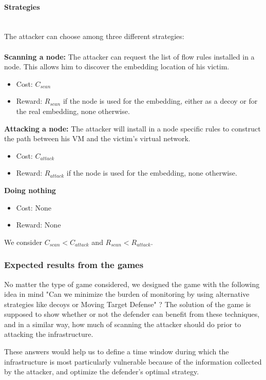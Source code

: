 \paragraph{Strategies}\textbf{\\}
The attacker can choose among three different strategies:\\ \\
\textbf{Scanning a node: } The attacker can request the list of  flow rules installed in a node. This allows him to discover the embedding location of his victim.
\begin{itemize}
    \item Cost: $C_{scan}$
    \item Reward: $R_{scan}$ if the node is used for the embedding, either as a decoy or for the real embedding, none otherwise.
\end{itemize}


\textbf{Attacking a node: } The attacker will install in a node specific rules to construct the path between his VM and the victim's virtual network.
\begin{itemize}
    \item Cost: $C_{attack}$
    \item Reward: $R_{attack}$ if the node is used for the embedding, none otherwise. 
\end{itemize}

\textbf{Doing nothing}
\begin{itemize}
    \item Cost: None
    \item Reward: None
\end{itemize}

We consider $C_{scan}< C_{attack}$ and $R_{scan}< R_{attack}$.

\subsubsection{Expected results from the games}
No matter the type of game considered, we designed the game with the following idea in mind "Can we minimize the burden of monitoring by using alternative strategies like decoys or Moving Target Defense" ?
The solution of the game is supposed to show whether or not the defender can benefit from these techniques, and in a similar way, how much of scanning the attacker should do prior to attacking the infrastructure.

These answers would help us to define a time window during which the infrastructure is most particularly vulnerable because of the information collected by the attacker, and optimize the defender's optimal strategy.

